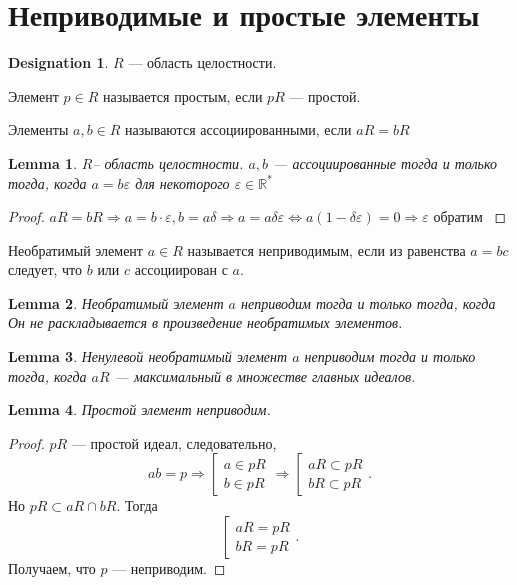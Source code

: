 \documentclass[11pt]{book}
\newcommand{\R}{\mathbb{R}}
\theoremstyle{definition}
\theoremstyle{plain}
\theoremstyle{plain}
\newtheorem{lm}{Lemma}
\theoremstyle{definition}
\newtheorem*{name}{Designation}
\theoremstyle{remark}
\begin{document}
\section{Неприводимые и простые элементы}
\begin{name}
    $ R$ --- область целостности.
\end{name}
\begin{defn}
    Элемент $ p \in R$ называется {\sf простым}, если $ pR$ --- простой.
\end{defn}
\begin{defn}
    Элементы $ a, b \in  R$ называются  {\sf ассоциированными}, если $ aR = bR$
\end{defn}
\begin{lm}
    $ R $-- область целостности. $ a, b$ --- ассоциированные тогда и только тогда, когда  $ a = b \varepsilon $ для некоторого $ \varepsilon \in \R^{*}$
\end{lm}
\begin{proof}
    $ aR = bR \Rightarrow a = b \cdot \varepsilon , b = a \delta  \Rightarrow a = a \delta  \varepsilon  \Leftrightarrow a (1- \delta  \varepsilon ) = 0 \Rightarrow \varepsilon  \text{ обратим }$
\end{proof}
\begin{defn}
    Необратимый элемент $ a \in R$ называется {\sf неприводимым}, если из равенства $ a = bc$ следует, что  $ b$ или  $ c$ ассоциирован с  $ a$.
\end{defn}
\begin{lm}
    Необратимый элемент $ a$ неприводим  тогда и только тогда, когда Он не раскладывается в произведение необратимых элементов.
\end{lm}
\begin{lm}\label{lm_acc}
    Ненулевой необратимый элемент $ a$ неприводим  тогда и только тогда, когда $ aR$ --- максимальный в множестве главных идеалов.
\end{lm}
\begin{lm}\label{lm_p_np}
    Простой элемент неприводим.
\end{lm}
\begin{proof}
    $ pR$ --- простой идеал, следовательно,
    \[
	ab = p \Rightarrow
	\left [
	    \begin{array}{l}
		a \in  pR \\
		b \in  pR

	    \end{array}
	\right .
	\Rightarrow
	\left[
	    \begin{array}{l}
		aR \subset pR \\
		bR \subset  pR
	    \end{array}
	\right .
    .\]
    Но $ pR \subset  aR \cap bR$. Тогда
    \[
	\left[
	    \begin{array}{l}
		aR = pR \\
		bR = pR
	    \end{array}
	\right.
    .\]
    Получаем, что $ p$ --- неприводим.
\end{proof}
\end{document}
